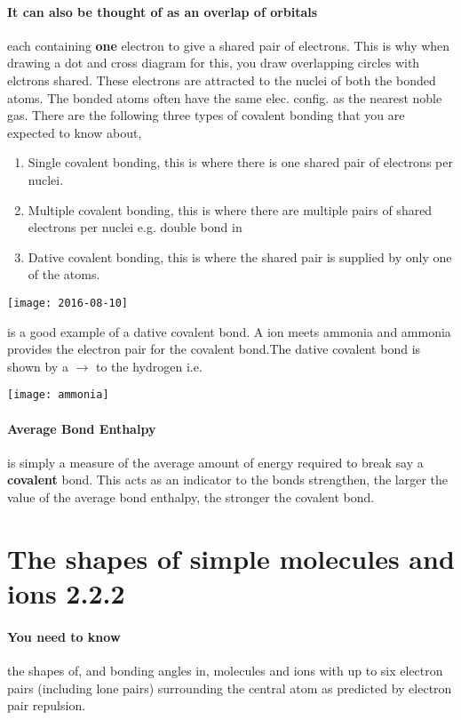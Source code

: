     \paragraph{It can also be thought of as an overlap of orbitals} each containing \textbf{one} electron to give a shared pair of electrons. 
    This is why when drawing a dot and cross diagram for this, you draw overlapping circles with elctrons shared.
    These electrons are attracted to the nuclei of both the bonded atoms.
    The bonded atoms often have the same elec. config. as the nearest noble gas.
    There are the following three types of covalent bonding that you are expected to know about,
	\begin{enumerate}
		\item Single covalent bonding, this is where there is one shared pair of electrons per nuclei.
		\item Multiple covalent bonding, this is where there are multiple pairs of shared electrons per nuclei e.g. double bond in  
		\item Dative covalent bonding, this is where the shared pair is supplied by only one of the atoms.
	\end{enumerate}
   \begin{center}
   \texttt{[image: 2016-08-10]}
\end{center}
    is a good example of a dative covalent bond. A  ion meets ammonia and ammonia provides the electron pair for the covalent bond.The dative covalent bond is shown by a $\rightarrow$ to the hydrogen i.e.
   \newline
    \begin{center}
\texttt{[image: ammonia]}
\end{center}
	
	\paragraph{Average Bond Enthalpy} is simply a measure of the average amount of energy required to break say a  \textbf{covalent} bond.
	This acts as an indicator to the bonds strengthen, the larger the value of the average bond enthalpy, the stronger the covalent bond.
    \section{The shapes of simple molecules and ions 2.2.2}
	
	\paragraph{You need to know} the shapes of, and bonding angles in, molecules and ions with up to six electron pairs (including lone pairs) surrounding the central atom as predicted by electron pair repulsion.
	
